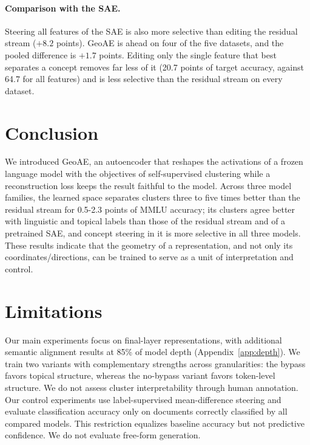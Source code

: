 \documentclass[11pt]{article}
\begin{document}
\paragraph{Comparison with the SAE.}
Steering all features of the SAE is also more selective than editing the residual stream ($+8.2$ points).
GeoAE is ahead on four of the five datasets, and the pooled difference is $+1.7$ points.
Editing only the single feature that best separates a concept removes far less of it (20.7 points of target accuracy, against 64.7 for all features) and is less selective than the residual stream on every dataset.

\section{Conclusion}

We introduced GeoAE, an autoencoder that reshapes the activations of a frozen language model with the objectives of self-supervised clustering while a reconstruction loss keeps the result faithful to the model.
Across three model families, the learned space separates clusters three to five times better than the residual stream for 0.5-2.3 points of MMLU accuracy; its clusters agree better with linguistic and topical labels than those of the residual stream and of a pretrained SAE, and concept steering in it is more selective in all three models.
These results indicate that the geometry of a representation, and not only its coordinates/directions, can be trained to serve as a unit of interpretation and control.

\section*{Limitations}

Our main experiments focus on final-layer representations, with additional semantic alignment results at 85\% of model depth (Appendix~\ref{app:depth}). We train two variants with complementary strengths across granularities: the bypass favors topical structure, whereas the no-bypass variant favors token-level structure. We do not assess cluster interpretability through human annotation. Our control experiments use label-supervised mean-difference steering and evaluate classification accuracy only on documents correctly classified by all compared models. This restriction equalizes baseline accuracy but not predictive confidence. We do not evaluate free-form generation.


\end{document}

